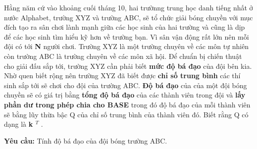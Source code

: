Hằng năm cứ vào khoảng cuối tháng 10, hai trườnng trung học danh tiếng nhất ở nước Alphabet, trường XYZ và trường ABC, sẽ tổ chức giải bóng chuyền với mục đích tạo ra sân chơi lành mạnh giữa các học sinh của hai trường và cũng là dịp để các học sinh tìm hiểu kỹ hơn về trường bạn. Vì sân vận động rất lớn nên mỗi đội có tới    \textbf{     N    }    người chơi. Trường XYZ là một trường chuyên về các môn tự nhiên còn trường ABC là trường chuyên về các môn xã hội. Để chuẩn bị chiến thuật cho giải đấu sắp tới, trường XYZ cần phải biết    \textbf{     mức độ bá đạo    }    của đội bên kia. Nhờ quen biết rộng nên trường XYZ đã biết được    \textbf{     chỉ số trung bình    }    các thí sinh sắp tới sẽ chơi cho đội của trường ABC.    \textbf{     Độ bá đạo    }    của của một đội bóng chuyền sẽ có giá trị bằng    \textbf{     tổng độ bá đạo    }    của các thành viên trong đội và    \textbf{     lấy phần dư trong phép chia cho BASE    }    trong đó độ bá đạo của mỗi thành viên sẽ bằng lũy thừa bậc Q của chỉ số trung bình của thành viên đó. Biết rằng Q có dạng là    \textbf{     k     $^      T     $}    .   



\textbf{     Yêu cầu:    }    Tính độ bá đạo của đội bóng trường ABC.